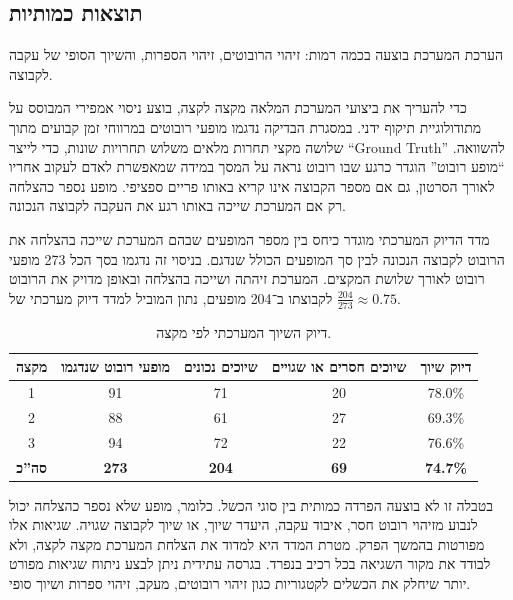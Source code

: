 \subsection{תוצאות כמותיות}

הערכת המערכת בוצעה בכמה רמות: זיהוי הרובוטים, זיהוי הספרות, והשיוך
הסופי של עקבה לקבוצה.

כדי להעריך את ביצועי המערכת המלאה מקצה לקצה, בוצע ניסוי אמפירי המבוסס
על מתודולוגיית תיקוף ידני. במסגרת הבדיקה נדגמו מופעי רובוטים במרווחי
זמן קבועים מתוך שלושה מקצי תחרות מלאים משלוש תחרויות שונות, כדי לייצר
``\textenglish{Ground Truth}'' להשוואה. ``מופע רובוט'' הוגדר כרגע שבו
רובוט נראה על המסך במידה שמאפשרת לאדם לעקוב אחריו לאורך הסרטון, גם אם
מספר הקבוצה אינו קריא באותו פריים ספציפי. מופע נספר כהצלחה רק אם
המערכת שייכה באותו רגע את העקבה לקבוצה הנכונה.

מדד הדיוק המערכתי מוגדר כיחס בין מספר המופעים שבהם המערכת שייכה
בהצלחה את הרובוט לקבוצה הנכונה לבין סך המופעים הכולל שנדגם. בניסוי זה
נדגמו בסך הכל 273 מופעי רובוט לאורך שלושת המקצים. המערכת זיהתה ושייכה
בהצלחה ובאופן מדויק את הרובוט לקבוצתו ב־204 מופעים, נתון המוביל למדד
דיוק מערכתי של $\frac{204}{273} \approx 0.75$.

\begin{table}[H]
  \centering
  \begin{tabular}{|c|c|c|c|c|}
    \hline
    \textbf{מקצה} &
    \textbf{מופעי רובוט שנדגמו} &
    \textbf{שיוכים נכונים} &
    \textbf{שיוכים חסרים או שגויים} &
    \textbf{דיוק שיוך} \\ \hline

    1 & 91 & 71 & 20 & 78.0\% \\ \hline
    2 & 88 & 61 & 27 & 69.3\% \\ \hline
    3 & 94 & 72 & 22 & 76.6\% \\ \hline
    \textbf{סה''כ} & \textbf{273} & \textbf{204} & \textbf{69} & \textbf{74.7\%} \\ \hline
  \end{tabular}
  \caption{דיוק השיוך המערכתי לפי מקצה.}
\end{table}

בטבלה זו לא בוצעה הפרדה כמותית בין סוגי הכשל. כלומר, מופע שלא נספר
כהצלחה יכול לנבוע מזיהוי רובוט חסר, איבוד עקבה, היעדר שיוך, או שיוך
לקבוצה שגויה. שגיאות אלו מפורטות בהמשך הפרק. מטרת המדד היא למדוד את
הצלחת המערכת מקצה לקצה, ולא לבודד את מקור השגיאה בכל רכיב בנפרד. בגרסה
עתידית ניתן לבצע ניתוח שגיאות מפורט יותר שיחלק את הכשלים לקטגוריות
כגון זיהוי רובוטים, מעקב, זיהוי ספרות ושיוך סופי.

